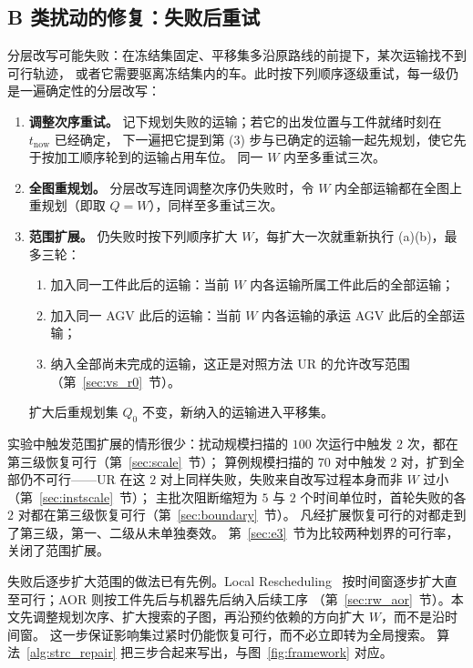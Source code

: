 \documentclass[manuscript,screen,review]{acmart}
\newcommand{\ScalePairs}{70}
\begin{document}
\subsection{B 类扰动的修复：失败后重试}
\label{sec:scope_escalation}

分层改写可能失败：在冻结集固定、平移集多沿原路线的前提下，某次运输找不到可行轨迹，
或者它需要驱离冻结集内的车。此时按下列顺序逐级重试，每一级仍是一遍确定性的分层改写：
\begin{enumerate}[label=(\alph*),leftmargin=2em,itemsep=0.15em]
\item \textbf{调整次序重试。} 记下规划失败的运输；若它的出发位置与工件就绪时刻在 \(t_{\mathrm{now}}\) 已经确定，
下一遍把它提到第 (3) 步与已确定的运输一起先规划，使它先于按加工顺序轮到的运输占用车位。
同一 \(W\) 内至多重试三次。
\item \textbf{全图重规划。} 分层改写连同调整次序仍失败时，令 \(W\) 内全部运输都在全图上重规划（即取 \(Q=W\)），同样至多重试三次。
\item \textbf{范围扩展。} 仍失败时按下列顺序扩大 \(W\)，每扩大一次就重新执行 (a)(b)，最多三轮：
\begin{enumerate}[label=(\roman*),leftmargin=1.6em,itemsep=0.1em]
\item 加入同一工件此后的运输：当前 \(W\) 内各运输所属工件此后的全部运输；
\item 加入同一 AGV 此后的运输：当前 \(W\) 内各运输的承运 AGV 此后的全部运输；
\item 纳入全部尚未完成的运输，这正是对照方法 UR 的允许改写范围（第~\ref{sec:vs_r0}~节）。
\end{enumerate}
扩大后重规划集 \(Q_0\) 不变，新纳入的运输进入平移集。
\end{enumerate}
实验中触发范围扩展的情形很少：扰动规模扫描的 \(100\) 次运行中触发 \(2\) 次，都在第三级恢复可行（第~\ref{sec:scale}~节）；
算例规模扫描的 \(\ScalePairs\) 对中触发 \(2\) 对，扩到全部仍不可行——UR 在这 \(2\) 对上同样失败，失败来自改写过程本身而非 \(W\) 过小（第~\ref{sec:instscale}~节）；
主批次阻断缩短为 \(5\) 与 \(2\) 个时间单位时，首轮失败的各 \(2\) 对都在第三级恢复可行（第~\ref{sec:boundary}~节）。
凡经扩展恢复可行的对都走到了第三级，第一、二级从未单独奏效。
第~\ref{sec:e3}~节为比较两种划界的可行率，关闭了范围扩展。

失败后逐步扩大范围的做法已有先例。Local Rescheduling~\cite{kuster2007local}
按时间窗逐步扩大直至可行；AOR 则按工件先后与机器先后纳入后续工序
（第~\ref{sec:rw_aor}~节）。本文先调整规划次序、扩大搜索的子图，再沿预约依赖的方向扩大 \(W\)，而不是沿时间窗。
这一步保证影响集过紧时仍能恢复可行，而不必立即转为全局搜索。
算法~\ref{alg:strc_repair} 把三步合起来写出，与图~\ref{fig:framework} 对应。
\end{document}
